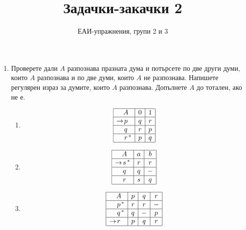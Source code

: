 \documentclass[a4paper]{scrartcl}
\title{Задачки-закачки 2}
\subtitle{ЕАИ-упражнения, групи 2 и 3}
\newcommand{\state}[1]{ & #1 & }
\newcommand{\start}[1]{\to & #1 & }
\newcommand{\accep}[1]{ & #1 & {}^* }
\newcommand{\stacc}[1]{\to & #1 & {}^* }
\begin{document}
\maketitle


\begin{enumerate} 

    \section*{детерминирани крайни автомати}
    
\item Проверете дали $A$ разпознава празната дума и потърсете по две други думи, които $A$ разпознава и по две думи, които $A$ не разпознава.
    Напишете регулярен израз за думите, които $A$ разпознава. Допълнете $A$ до тотален, ако не е.
    \begin{multicols}{2}
        \raggedright
        \begin{enumerate}
            \item \[\begin{array}{|r@{}c@{}l|c|c|c|}
                        \hline
                        \state{A} & 0 & 1 \\ \hline
                        \start{p} & q & r \\ \hline
                        \state{q} & r & p \\ \hline
                        \accep{r} & p & q \\ \hline
                \end{array}\]

            \item \[\begin{array}{|r@{}c@{}l|c|c|c|}
                        \hline
                        \state{A} & a & b \\ \hline
                        \stacc{s} & r & r \\ \hline
                        \state{q} & q & - \\ \hline
                        \state{r} & s & q \\ \hline
                \end{array}\]

            \item \[\begin{array}{|r@{}c@{}l|c|c|c|c|}
                        \hline
                        \state{A} & p & q & r \\ \hline
                        \accep{p} & r & r & - \\ \hline
                        \accep{q} & q & - & p \\ \hline
                        \start{r} & p & q & r \\ \hline
                \end{array}\]


\end{enumerate}
\end{multicols}
\end{enumerate}
\end{document}
